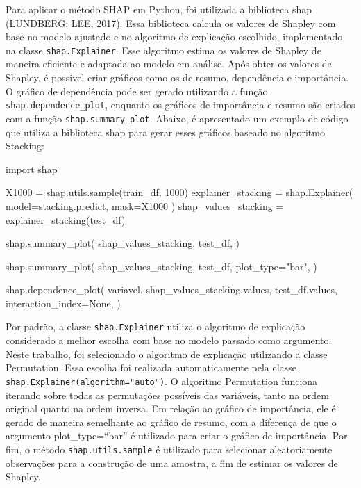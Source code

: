\documentclass[
  12pt,
  a4paper,
]{scrreprt}
\newenvironment{Shaded}{}{}
\newcommand{\DecValTok}[1]{\textcolor[rgb]{0.00,0.36,0.77}{#1}}
\newcommand{\ImportTok}[1]{\textcolor[rgb]{0.01,0.18,0.38}{#1}}
\newcommand{\NormalTok}[1]{\textcolor[rgb]{0.14,0.16,0.18}{#1}}
\newcommand{\OperatorTok}[1]{\textcolor[rgb]{0.14,0.16,0.18}{#1}}
\newcommand{\StringTok}[1]{\textcolor[rgb]{0.01,0.18,0.38}{#1}}
\newcommand{\VariableTok}[1]{\textcolor[rgb]{0.89,0.38,0.04}{#1}}
\begin{document}
\vspace{12pt}

Para aplicar o método SHAP em Python, foi utilizada a biblioteca shap
(LUNDBERG; LEE, 2017). Essa biblioteca calcula os valores de Shapley com
base no modelo ajustado e no algoritmo de explicação escolhido,
implementado na classe \texttt{shap.Explainer}. Esse algoritmo estima os
valores de Shapley de maneira eficiente e adaptada ao modelo em análise.
Após obter os valores de Shapley, é possível criar gráficos como os de
resumo, dependência e importância. O gráfico de dependência pode ser
gerado utilizando a função \texttt{shap.dependence\_plot}, enquanto os
gráficos de importância e resumo são criados com a função
\texttt{shap.summary\_plot}. Abaixo, é apresentado um exemplo de código
que utiliza a biblioteca shap para gerar esses gráficos baseado no
algoritmo Stacking:

\begin{Shaded}
\begin{Highlighting}[]
\ImportTok{import}\NormalTok{ shap}

\NormalTok{X1000 }\OperatorTok{=}\NormalTok{ shap.utils.sample(train\_df, }\DecValTok{1000}\NormalTok{)}
\NormalTok{explainer\_stacking }\OperatorTok{=}\NormalTok{ shap.Explainer(}
\NormalTok{    model}\OperatorTok{=}\NormalTok{stacking.predict,}
\NormalTok{    mask}\OperatorTok{=}\NormalTok{X1000}
\NormalTok{    )}
\NormalTok{shap\_values\_stacking }\OperatorTok{=}\NormalTok{ explainer\_stacking(test\_df)}

\NormalTok{shap.summary\_plot(}
\NormalTok{    shap\_values\_stacking,}
\NormalTok{    test\_df,}
\NormalTok{    )}

\NormalTok{shap.summary\_plot(}
\NormalTok{    shap\_values\_stacking,}
\NormalTok{    test\_df,}
\NormalTok{    plot\_type}\OperatorTok{=}\StringTok{"bar"}\NormalTok{,}
\NormalTok{    )}

\NormalTok{shap.dependence\_plot(}
\NormalTok{    variavel,}
\NormalTok{    shap\_values\_stacking.values,}
\NormalTok{    test\_df.values,}
\NormalTok{    interaction\_index}\OperatorTok{=}\VariableTok{None}\NormalTok{,}
\NormalTok{    )}
\end{Highlighting}
\end{Shaded}

Por padrão, a classe \texttt{shap.Explainer} utiliza o algoritmo de
explicação considerado a melhor escolha com base no modelo passado como
argumento. Neste trabalho, foi selecionado o algoritmo de explicação
utilizando a classe Permutation. Essa escolha foi realizada
automaticamente pela classe \texttt{shap.Explainer(algorithm="auto")}. O
algoritmo Permutation funciona iterando sobre todas as permutações
possíveis das variáveis, tanto na ordem original quanto na ordem
inversa. Em relação ao gráfico de importância, ele é gerado de maneira
semelhante ao gráfico de resumo, com a diferença de que o argumento
plot\_type=``bar'' é utilizado para criar o gráfico de importância. Por
fim, o método \texttt{shap.utils.sample} é utilizado para selecionar
aleatoriamente observações para a construção de uma amostra, a fim de
estimar os valores de Shapley.
\end{document}
